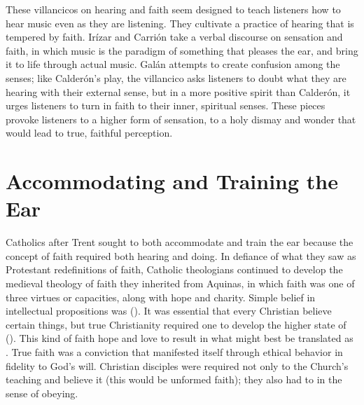 These villancicos on hearing and faith seem designed to teach listeners how to
hear music even as they are listening. They cultivate a practice of hearing
that is tempered by faith.
Irízar and Carrión take a verbal discourse on sensation and faith, in which
music is the paradigm of something that pleases the ear, and bring it to life
through actual music.
Galán attempts to create confusion among the senses; like Calderón's play, the
villancico asks listeners to doubt what they are hearing with their external
sense, but in a more positive spirit than Calderón, it urges listeners to turn
in faith to their inner, spiritual senses.
These pieces provoke listeners to a higher form of sensation, to a holy dismay
and wonder that would lead to true, faithful perception.

\section{Accommodating and Training the Ear}

Catholics after Trent sought to both accommodate and train the ear because the
concept of faith required both hearing and doing.
In defiance of what they saw as Protestant redefinitions of faith, Catholic
theologians continued to develop the medieval theology of faith they inherited
from Aquinas, in which faith was one of three virtues or capacities, along with
hope and charity.%
    \Autocite[130--132]{Schreiner:Certainty}
Simple belief in intellectual propositions was 
().%
    \Autocite[]{Catholic:Catechismus1614}
It was essential that every Christian believe certain things, but true
Christianity required one to develop the higher state of 
().
This kind of faith  hope and love to result in  what
might best be translated as .
True faith was a conviction that manifested itself through ethical behavior in
fidelity to God's will.
Christian disciples were required not only to  the Church's
teaching and believe it (this would be unformed faith); they also had to
 in the sense of obeying.


